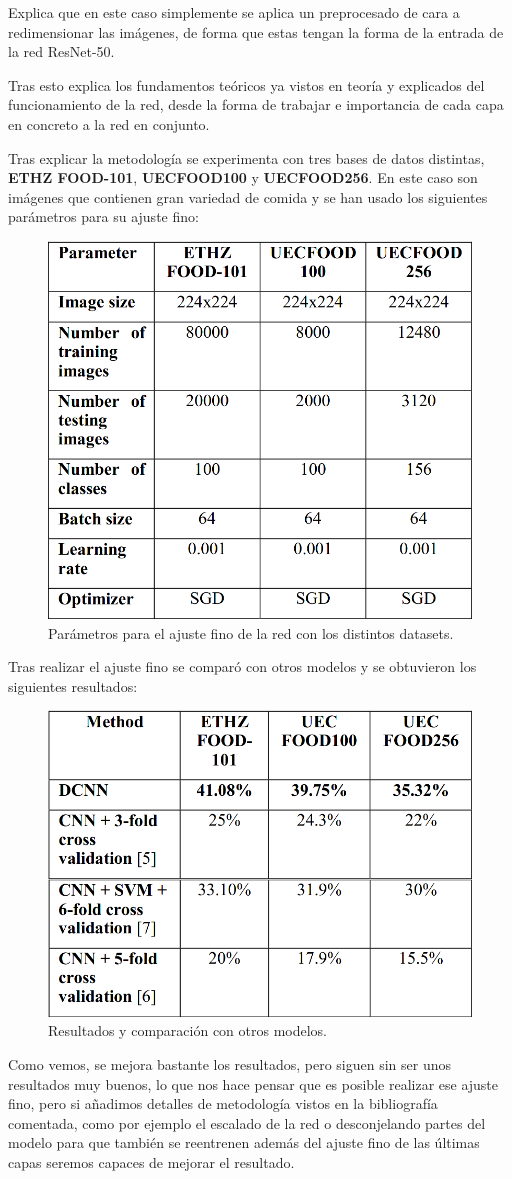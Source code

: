 Explica que en este caso simplemente se aplica un preprocesado de cara a redimensionar las imágenes, de forma que estas tengan la forma de la entrada de la red ResNet-50.

Tras esto explica los fundamentos teóricos ya vistos en teoría y explicados del funcionamiento de la red, desde la forma de trabajar e importancia de cada capa en concreto a la red en conjunto.

Tras explicar la metodología se experimenta con tres bases de datos distintas, \textbf{ETHZ FOOD-101}, \textbf{UECFOOD100} y \textbf{UECFOOD256}. En este caso son imágenes que contienen gran variedad de comida y se han usado los siguientes parámetros para su ajuste fino:

\begin{figure}[H]
  \centering
  \includegraphics[width=0.5\linewidth]{Imagenes/parametros_food_resnet.png}
  \caption{Parámetros para el ajuste fino de la red con los distintos datasets.}
  \label{fig:sub-first}
\end{figure}

Tras realizar el ajuste fino se comparó con otros modelos y se obtuvieron los siguientes resultados:

\begin{figure}[H]
  \centering
  \includegraphics[width=0.5\linewidth]{Imagenes/resultados_resnet_food.png}
  \caption{Resultados y comparación con otros modelos.}
  \label{fig:sub-first}
\end{figure}

Como vemos, se mejora bastante los resultados, pero siguen sin ser unos resultados muy buenos, lo que nos hace pensar que es posible realizar ese ajuste fino, pero si añadimos detalles de metodología vistos en la bibliografía comentada, como por ejemplo el escalado de la red o desconjelando partes del modelo para que también se reentrenen además del ajuste fino de las últimas capas seremos capaces de mejorar el resultado.
